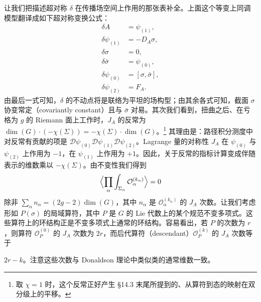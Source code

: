 让我们把描述超对称 $\delta$ 在传播场空间上作用的那张表补全。上面这个等变上同调模型翻译成如下超对称变换公式：
\[
\begin{aligned}
  \delta A&=\psi_{(1)},\\
  \delta\psi_{(1)}&=-D_A\sigma,\\
  \delta\sigma&=0,\\
  \delta\bar\sigma&=\psi_{(0)},\\
  \delta\psi_{(0)}&=[\sigma,\bar\sigma],\\
  \delta\psi_{(2)}&=F_A.
\end{aligned}
\]
由最后一式可知，$\delta$ 的不动点将是联络为平坦的场构型；由其余各式可知，截面 $\sigma$ 协变常定（covariantly constant）且与 $\bar\sigma$ 对易。其次我们看到，扭曲之后、在亏格为 $g$ 的 Riemann 面上工作时，$J_A$ 的反常为 $\dim(G)\cdot(-\chi(\Sigma))=-\chi(\Sigma)\cdot\dim(G)$。\footnote{取 $\chi=1$ 时，这个反常正好产生 §14.3 末尾所提到的、从算符到态的映射在双分级上的平移。} 其理由是：路径积分测度中对反常有贡献的项是 $\mathcal D\psi_{(0)}\mathcal D\psi_{(1)}\mathcal D\psi_{(2)}$。Lagrange 量的对称性 $J_A$ 在 $\psi_{(0)}$ 与 $\psi_{(2)}$ 上作用为 $-1$，在 $\psi_{(1)}$ 上作用为 $+1$。因此，关于反常的指标计算变成伴随表示的维数乘以 $-\chi(\Sigma)$。由不变性我们得到
\[
  \Bigl\langle\prod_{\alpha}\int_{\Sigma_\alpha}\mathcal O_\alpha^{(k_\alpha)}\Bigr\rangle=0
\]
除非 $\sum_\alpha n_\alpha=(2g-2)\dim(G)$，其中 $n_\alpha$ 是 $\mathcal O_\alpha^{(k_\alpha)}$ 的 $J_A$ 次数。让我们考虑形如 $P(\sigma)$ 的局域算符，其中 $P$ 是 $G$ 的 Lie 代数上的某个规范不变多项式。这些算符上的环结构正是不变多项式上通常的环结构。容易看出，若 $P$ 的次数为 $r$，则算符 $\mathcal O_P^{(0)}$ 的 $J_A$ 次数为 $2r$，而后代算符（descendant）$\mathcal O_P^{(k)}$ 的 $J_A$ 次数等于 %



$2r-k$。注意这些次数与 Donaldson 理论中类似类的通常维数一致。

